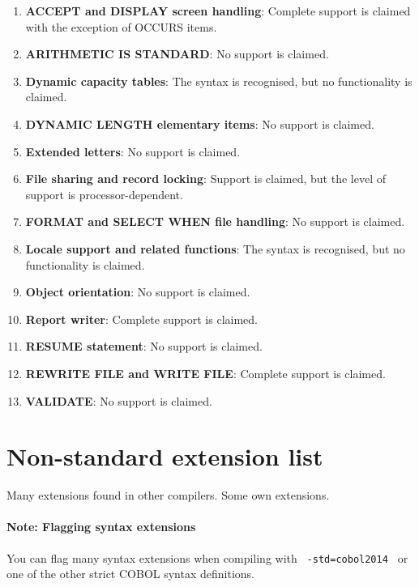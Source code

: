 \begin{enumerate}
\item \textbf{ACCEPT and DISPLAY screen handling}: Complete support is claimed with the exception of OCCURS items.
\item \textbf{ARITHMETIC IS STANDARD}: No support is claimed.
\item \textbf{Dynamic capacity tables}: The syntax is recognised, but no functionality is claimed.
\item \textbf{DYNAMIC LENGTH elementary items}: No support is claimed.
\item \textbf{Extended letters}: No support is claimed.
\item \textbf{File sharing and record locking}: Support is claimed, but the level of support is processor-dependent. %
\item \textbf{FORMAT and SELECT WHEN file handling}: No support is claimed.
\item \textbf{Locale support and related functions}: The syntax is recognised, but no functionality is claimed.  %
\item \textbf{Object orientation}: No support is claimed.
\item \textbf{Report writer}: Complete support is claimed.
\item \textbf{RESUME statement}: No support is claimed.
\item \textbf{REWRITE FILE and WRITE FILE}: Complete support is claimed.
\item \textbf{VALIDATE}: No support is claimed.
\end{enumerate}


\section{Non-standard extension list}

Many extensions found in other compilers.  %
Some own extensions.  %

\paragraph{Note: Flagging syntax extensions}

You can flag many syntax extensions when compiling with \texttt{ -std=cobol2014 } or one of the other strict COBOL syntax definitions.

